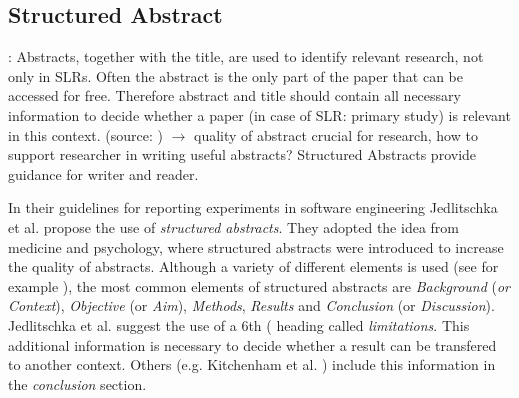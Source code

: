 \subsection{Structured Abstract}

: Abstracts, together with the title, are used to identify relevant research, not only in SLRs. Often the abstract is the only part of the paper that can be accessed for free. Therefore abstract and title should contain all necessary information to decide whether a paper (in case of SLR: primary study) is relevant in this context. (source: )
	$\rightarrow$ quality of abstract crucial for research, how to support researcher in writing useful abstracts? Structured Abstracts provide guidance for writer and reader. 
\newline

In their guidelines for reporting experiments in software engineering Jedlitschka et al. \cite{Jedlitschka2008} propose the use of \emph{structured abstracts}. They adopted the idea from medicine and psychology, where structured abstracts were introduced to increase the quality of abstracts. Although a variety of different elements is used (see for example ), the most common elements of structured abstracts are \emph{Background} (\emph{or Context}), \emph{Objective} (or \emph{Aim}), \emph{Methods}, \emph{Results} and \emph{Conclusion} (or \emph{Discussion}). Jedlitschka et al. \cite{Jedlitschka2008} suggest the use of a 6th ( heading called \emph{limitations}. This additional information is necessary to decide whether a result can be transfered to another context. Others  (e.g. Kitchenham et al. \cite{KBO2008}) include this information in the \emph{conclusion} section.

